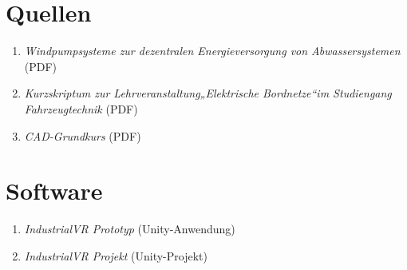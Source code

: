 

\appendix
\renewcommand\thesection{\Alph{section}}

\section{Quellen}

\begin{enumerate}[label=A\arabic*]

\item \textit{Windpumpsysteme zur dezentralen Energieversorgung von Abwassersystemen} (PDF)
\item \textit{Kurzskriptum zur Lehrveranstaltung„Elektrische Bordnetze“im Studiengang Fahrzeugtechnik} (PDF)
\item \textit{CAD-Grundkurs} (PDF)
 
\end{enumerate}

\section{Software}

\begin{enumerate}[label=B\arabic*]

\item \textit{IndustrialVR Prototyp} (Unity-Anwendung)
\item \textit{IndustrialVR Projekt} (Unity-Projekt)

\end{enumerate}